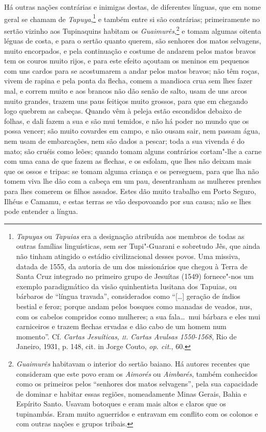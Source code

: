  Há outras nações contrárias e inimigas destas, de diferentes línguas,
que em nome geral se chamam de \textit{Tapuya},\footnote{ \textit{Tapuyas} 
ou \textit{Tapuias} era a designação atribuída aos
membros de todas as outras famílias linguísticas, sem ser Tupi"-Guarani
e sobretudo Jês, que ainda não tinham atingido o estádio
civilizacional desses povos. Uma missiva, datada de 1555, da autoria
de um dos missionários que chegou à Terra de Santa Cruz integrado no
primeiro grupo de Jesuítas (1549) fornece"-nos um exemplo paradigmático
da visão quinhentista lusitana dos Tapuias, ou bárbaros de ``língua
travada'', considerados como ``[\ldots] geração de índios bestial e feroz;
porque andam pelos bosques como manadas de veados, nus, com os cabelos
compridos como mulheres; a sua fala\ldots\ mui bárbara e eles mui
carniceiros e trazem flechas ervadas e dão cabo de um homem num
momento''. Cf. \textit{Cartas Jesuíticas, \textsc{ii}. Cartas Avulsas
1550-1568}, Rio de Janeiro, 1931, p. 148, cit. in Jorge Couto,
\textit{op. cit.}, 60.} e também entre si são contrárias;
primeiramente no sertão vizinho aos Tupinaquins habitam os
\textit{Guaimurês},\footnote{ \textit{Guaimurês} habitavam o
interior do sertão baiano. Há autores recentes que consideram que este
povo eram os \textit{Aimorés} ou \textit{Aimbarés}, também conhecidos
como os primeiros pelos ``senhores dos matos selvagens'', pela sua
capacidade de dominar e habitar essas regiões, nomeadamente Minas
Gerais, Bahia e Espírito Santo. Usavam botoques e eram mais altos e
claros que os tupinambás. Eram muito aguerridos e entravam em conflito
com os colonos e com outras nações e grupos tribais.} e tomam
algumas oitenta léguas de costa, e para o sertão quanto querem, são
senhores dos matos selvagens, muito encorpados, e pela continuação e
costume de andarem pelos matos bravos tem os couros muito rijos, e para
este efeito açoutam os meninos em pequenos com uns cardos para se
acostumarem a andar pelos matos bravos; não têm roças, vivem de rapina
e pela ponta da flecha, comem a mandioca crua sem lhes fazer mal, e
correm muito e aos brancos não dão senão de salto, usam de uns arcos
muito grandes, trazem uns paus feitiços muito grossos, para que em
chegando logo quebrem as cabeças. Quando vêm à peleja estão escondidos
debaixo de folhas, e dali fazem a sua e são mui temidos, e não há poder
no mundo que os possa vencer; são muito covardes em campo, e não ousam
sair, nem passam água, nem usam de embarcações, nem são dados a pescar;
toda a sua vivenda é do mato; são cruéis como leões; quando tomam
alguns contrários cortam"-lhe a carne com uma cana de que fazem as
flechas, e os esfolam, que lhes não deixam mais que os ossos e tripas:
se tomam alguma criança e os perseguem, para que lha não tomem viva lhe
dão com a cabeça em um pau, desentranham as mulheres prenhes para lhes
comerem os filhos assados. Estes dão muito trabalho em Porto Seguro,
Ilhéus e Camamu, e estas terras se vão despovoando por sua causa; não
se lhes pode entender a língua. 

